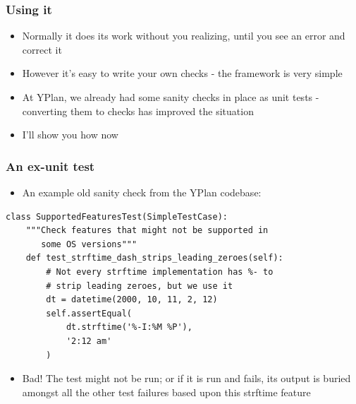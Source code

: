 \documentclass{beamer}
\begin{document}
\begin{frame}[fragile]\frametitle{Using it}

    \begin{itemize}
        \item Normally it does its work without you realizing, until you see an error and correct it
        \item However it's easy to write your own checks - the framework is very simple
        \item At YPlan, we already had some sanity checks in place as unit tests - converting them to checks has improved the situation
        \item I'll show you how now
    \end{itemize}

\end{frame}


\begin{frame}[fragile]\frametitle{An ex-unit test}

    \begin{itemize}
        \item An example old sanity check from the YPlan codebase:
    \end{itemize}

    \begin{lstlisting}
class SupportedFeaturesTest(SimpleTestCase):
    """Check features that might not be supported in
       some OS versions"""
    def test_strftime_dash_strips_leading_zeroes(self):
        # Not every strftime implementation has %- to
        # strip leading zeroes, but we use it
        dt = datetime(2000, 10, 11, 2, 12)
        self.assertEqual(
            dt.strftime('%-I:%M %P'),
            '2:12 am'
        )
    \end{lstlisting}

    \begin{itemize}
        \item Bad! The test might not be run; or if it is run and fails, its output is buried amongst all the other test failures based upon this strftime feature
    \end{itemize}
\end{frame}
\end{document}
